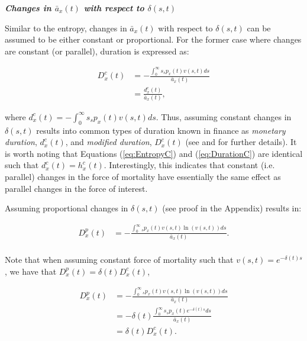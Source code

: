 \documentclass[12pt]{article}
\begin{document}
\textbf{\textit{{Changes in $\bar{a}_x(t)$ with respect to $\delta(s,t)$}}}

 Similar to the entropy, changes in $\bar{a}_x(t)$ with respect to $\delta(s,t)$ can be assumed to be either constant or proportional. For the former case where changes are constant (or parallel), duration is expressed as:

\begin{equation}\label{eq:DurationC}
\begin{split}
{D}^{c}_x(t)&= -\frac{\int_0^\infty s {}_sp_x(t) {v}(s,t)ds}{\bar{a}_x(t)} \\
&= \frac{{d}^{c}_x(t)}{\bar{a}_x(t)},
\end{split}
\end{equation}

where ${d}^{c}_x(t)=-\int_0^\infty s {}_sp_x(t) {v}(s,t)ds$. Thus, assuming constant changes in $\delta(s,t)$ results into common types of duration known in finance as \textit{monetary duration}, ${d}^{c}_x(t)$, and \textit{modified duration}, ${D}^{c}_x(t)$ (see \citet{Milevsky2012} and \citet{Tsai2013a} for further details). It is worth noting that Equations (\ref{eq:EntropyC}) and (\ref{eq:DurationC}) are identical such that ${d}^{c}_x(t)={h}^{c}_{x}(t)$. Interestingly, this indicates that constant (i.e. parallel) changes in the force of mortality have essentially the same effect as parallel changes in the force of interest.


Assuming proportional changes in $\delta(s,t)$ (see proof in the Appendix) results in: 


\begin{equation}\label{eq:DurationP}
\begin{split}
{D}^{p}_{x}(t) &= -\frac{\int_0^\infty {}_sp_x(t) v(s,t) \ln(v(s,t))ds}{\bar{a}_x(t)}. \\
\end{split}
\end{equation}


Note that when assuming constant force of mortality such that $v(s,t)=e^{-\delta(t)s}$, we have that ${D}^{p}_{x}(t)=\delta(t){D}^{c}_{x}(t)$,


\begin{equation}\label{eq:DurationCP}
\begin{split}
{D}^{p}_{x}(t) &= -\frac{\int_0^\infty {}_sp_x(t) v(s,t) \ln(v(s,t))ds}  {\bar{a}_x(t)} \\
&=- \delta(t)\frac{\int_0^\infty s{}_sp_x(t) e^{-\delta(t)s}  ds}{\bar{a}_x(t)} \\
& = \delta(t){D}^{c}_{x}(t).
\end{split}
\end{equation}
\end{document}
